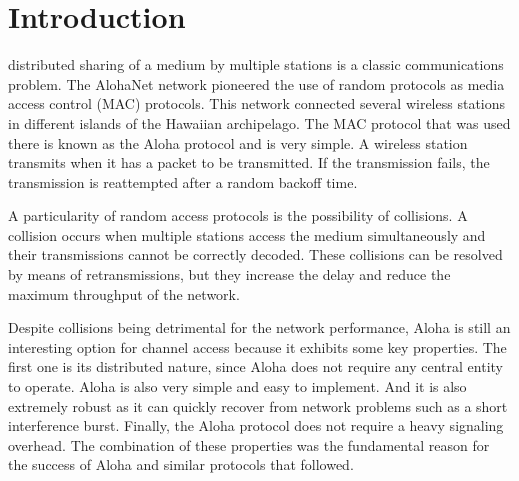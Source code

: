 \documentclass[journal]{IEEEtran}
\begin{document}
\section{Introduction}
% 
% 
% 
% 
 distributed sharing of a medium by multiple stations is a classic communications problem. 
The AlohaNet network \cite{abramson2009asw} pioneered the use of random protocols as media access control (MAC) protocols.
This network connected several wireless stations in different islands of the Hawaiian archipelago.
The MAC protocol that was used there is known as the Aloha protocol and is very simple.
A wireless station transmits when it has a packet to be transmitted. 
If the transmission fails, the transmission is reattempted after a random backoff time.

A particularity of random access protocols is the possibility of collisions.
A collision occurs when multiple stations access the medium simultaneously and their transmissions cannot be correctly decoded.
These collisions can be resolved by means of retransmissions, but they increase the delay and reduce the maximum throughput of the network.

Despite collisions being detrimental for the network performance, Aloha is still an interesting option for channel access because it exhibits some key properties.
The first one is its distributed nature, since Aloha does not require any central entity to operate.
Aloha is also very simple and easy to implement.
And it is also extremely robust as it can quickly recover from network problems such as a short interference burst.
Finally, the Aloha protocol does not require a heavy signaling overhead.
The combination of these properties was the fundamental reason for the success of Aloha and similar protocols that followed.
\end{document}
